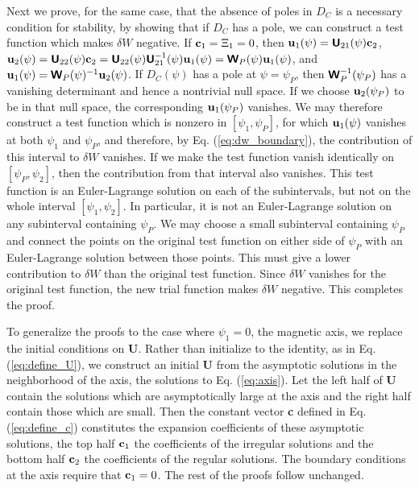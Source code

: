\documentclass[prb,twocolumn,showpacs,preprintnumbers,amsmath,amssymb]{revtex4}
\renewcommand*{\v}[1]{\hbox{\bfseries #1}}
\renewcommand*{\t}[1]{\hbox{\sffamily\bfseries #1}}
\begin{document}
Next we prove, for the same case, that the absence of poles in $D_C$ is
a necessary condition for stability, by showing that if $D_C$ has a
pole, we can construct a test function which makes $\delta W$ negative.
If $\v{c}_1 = \Xi_1 = 0$, then $\v{u}_1(\psi) = \t{U}_{21}(\psi)
\v{c}_2$, $\v{u}_2(\psi) = \t{U}_{22}(\psi) \v{c}_2 = \t{U}_{22}(\psi)
\t{U}_{21}^{-1}(\psi) \v{u}_1(\psi) = \t{W}_P(\psi) \v{u}_1(\psi)$, and
$\v{u}_1(\psi) = \t{W}_P(\psi)^{-1} \v{u}_2(\psi)$.  If $D_C(\psi)$ has
a pole at $\psi=\psi_P$, then $\t{W}_P^{-1}(\psi_P)$ has a vanishing
determinant and hence a nontrivial null space.  If we choose
$\v{u}_2(\psi_P)$ to be in that null space, the corresponding
$\v{u}_1(\psi_P)$ vanishes.  We may therefore construct a test function
which is nonzero in $[\psi_1,\psi_P]$, for which $\v{u}_1(\psi)$
vanishes at both $\psi_1$ and $\psi_P$, and therefore, by
Eq. (\ref{eq:dw_boundary}), the contribution of this interval to $\delta
W$ vanishes.  If we make the test function vanish identically on
$[\psi_P, \psi_2]$, then the contribution from that interval also
vanishes.  This test function is an Euler-Lagrange solution on each of
the subintervals, but not on the whole interval $[\psi_1,\psi_2]$.  In
particular, it is not an Euler-Lagrange solution on any subinterval
containing $\psi_P$.  We may choose a small subinterval containing
$\psi_P$ and connect the points on the original test function on either
side of $\psi_P$ with an Euler-Lagrange solution between those points.
This must give a lower contribution to $\delta W$ than the original test
function.  Since $\delta W$ vanishes for the original test function, the
new trial function makes $\delta W$ negative.  This completes the proof.

To generalize the proofs to the case where $\psi_1 = 0$, the magnetic
axis, we replace the initial conditions on \t{U}.  Rather than
initialize to the identity, as in Eq. (\ref{eq:define_U}), we construct
an initial \t{U} from the asymptotic solutions in the neighborhood of
the axis, the solutions to Eq. (\ref{eq:axis}).  Let the left half of
\t{U} contain the solutions which are asymptotically large at the axis
and the right half contain those which are small.  Then the constant
vector \v{c} defined in Eq. (\ref{eq:define_c}) constitutes the
expansion coefficients of these asymptotic solutions, the top half
$\v{c}_1$ the coefficients of the irregular solutions and the bottom
half $\v{c}_2$ the coefficients of the regular solutions.  The boundary
conditions at the axis require that $\v{c}_1 = 0$.  The rest of the
proofs follow unchanged.
\end{document}
